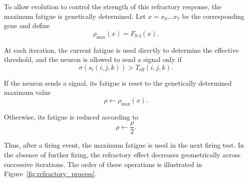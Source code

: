 \documentclass[12pt,a4paper]{article}
\begin{document}
\begin{enumerate}
	To allow evolution to control the strength of this refractory response, the maximum fatigue is genetically determined. Let $x=x_0\ldots x_7$ be the corresponding gene and define
	$$\rho_{\max}(x)=F_{0.4}(x).	$$

	At each iteration, the current fatigue is used directly to determine the effective threshold, and the neuron is allowed to send a signal only if
	$$\sigma(s_t(i,j,k)) > T_{\mathrm{eff}}(i,j,k).$$

	If the neuron sends a signal, its fatigue is reset to the genetically determined maximum value 
	$$\rho \leftarrow \rho_{\max}(x).$$

	Otherwise, its fatigue is reduced according to
	$$\rho \leftarrow \frac{\rho}{2}.$$

	Thus, after a firing event, the maximum fatigue is used in the next firing test. In the absence of further firing, the refractory effect decreases geometrically across successive iterations. The order of these operations is illustrated in Figure~\ref{fig:refractory_process}.

	\begin{figure}[H]
		\centering
\end{figure}
\end{enumerate}
\end{document}
